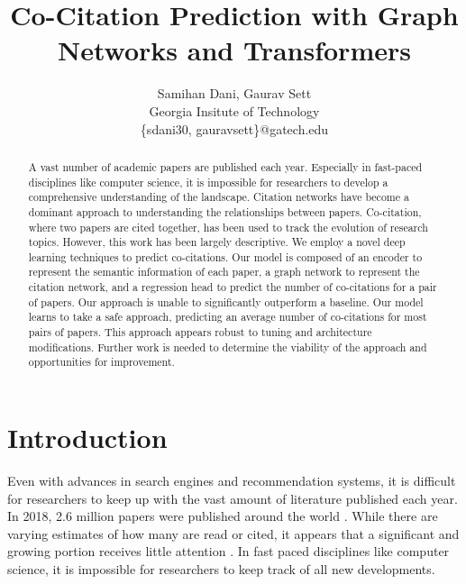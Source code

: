 \documentclass[10pt,twocolumn,letterpaper]{article}
\begin{document}
\title{Co-Citation Prediction with Graph Networks and Transformers}

\author{Samihan Dani, Gaurav Sett\\
Georgia Insitute of Technology\\
\{sdani30, gauravsett\}@gatech.edu
}
\maketitle


\begin{abstract}
   A vast number of academic papers are published each year. Especially in fast-paced disciplines like computer science, it is impossible for researchers to develop a comprehensive understanding of the landscape. 
   Citation networks have become a dominant approach to understanding the relationships between papers. Co-citation, where two papers are cited together, has been used to track the evolution of research topics. However, this work has been largely descriptive.
   We employ a novel deep learning techniques to predict co-citations.
   Our model is composed of an encoder to represent the semantic information of each paper, a graph network to represent the citation network, and a regression head to predict the number of co-citations for a pair of papers.
   Our approach is unable to significantly outperform a baseline. 
   Our model learns to take a safe approach, predicting an average number of co-citations for most pairs of papers.
   This approach appears robust to tuning and architecture modifications.
   Further work is needed to determine the viability of the approach and opportunities for improvement.
\end{abstract}


\section{Introduction}
\label{sec:intro}

Even with advances in search engines and recommendation systems, it is difficult for researchers to keep up with the vast amount of literature published each year. In 2018, 2.6 million papers were published around the world \cite{white2019publications}. While there are varying estimates of how many are read or cited, it appears that a significant and growing portion receives little attention \cite{evans2008electronic}. In fast paced disciplines like computer science, it is impossible for researchers to keep track of all new developments. 
\end{document}
